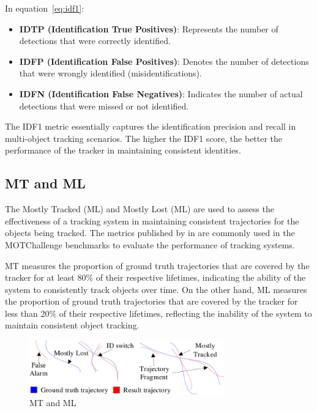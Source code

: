 In equation~\ref{eq:idf1}:

\begin{itemize}
    \item \textbf{IDTP (Identification True Positives)}: Represents the number of detections that were correctly identified.
    \item \textbf{IDFP (Identification False Positives)}: Denotes the number of detections that were wrongly identified (misidentifications).
    \item \textbf{IDFN (Identification False Negatives)}: Indicates the number of actual detections that were missed or not identified.
\end{itemize}

The IDF1 metric essentially captures the identification precision and recall in multi-object tracking scenarios. The higher the IDF1 score, the better the performance of the tracker in maintaining consistent identities.

\subsection{MT and ML}\label{subsec:mt_ml}
The Mostly Tracked (ML) and Mostly Lost (ML) are used to assess the effectiveness of a tracking system in maintaining consistent trajectories for the objects being tracked. The metrics published by \textcite{Wu06} in \citeyear{Wu06} are commonly used in the MOTChallenge benchmarks to evaluate the performance of tracking systems.

MT measures the proportion of ground truth trajectories that are covered by the tracker for at least 80\% of their respective lifetimes, indicating the ability of the system to consistently track objects over time. On the other hand, ML measures the proportion of ground truth trajectories that are covered by the tracker for less than 20\% of their respective lifetimes, reflecting the inability of the system to maintain consistent object tracking.

\begin{figure}[ht]
    \centering
    \includegraphics[width=0.75\textwidth]{resources/fig/Wu06-MT_ML.png}
    \caption{MT and ML \cite[Fig.~5]{Wu06}}\label{fig:mt_ml}
\end{figure}

